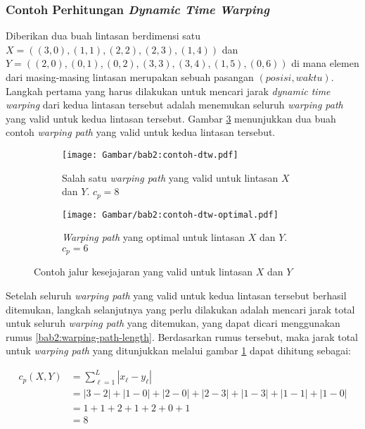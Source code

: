 \documentclass[a4paper,twoside]{article}
\begin{document}
\subsubsection{Contoh Perhitungan \textit{Dynamic Time Warping}}

Diberikan dua buah lintasan berdimensi satu $X = ((3, 0), (1, 1), (2, 2), (2, 3), (1, 4))$ dan $Y = ((2, 0), (0, 1), (0, 2), (3, 3), (3, 4), (1, 5), (0, 6))$ di mana elemen dari masing-masing lintasan merupakan sebuah pasangan $(posisi, waktu)$. Langkah pertama yang harus dilakukan untuk mencari jarak \textit{dynamic time warping} dari kedua lintasan tersebut adalah menemukan seluruh \textit{warping path} yang valid untuk kedua lintasan tersebut. Gambar \ref{bab2:contoh-dtw} menunjukkan dua buah contoh \textit{warping path} yang valid untuk kedua lintasan tersebut.

\begin{figure}[h]
    \centering
    \begin{subfigure}{0.225\textwidth}
        \centering
        \texttt{[image: Gambar/bab2:contoh-dtw.pdf]}
        \caption{Salah satu \textit{warping path} yang valid untuk lintasan $X$ dan $Y$. $c_p = 8$}
        \label{bab2:warping-path}
    \end{subfigure} \hspace{1cm}
    \begin{subfigure}{0.225\textwidth}
        \centering
        \texttt{[image: Gambar/bab2:contoh-dtw-optimal.pdf]}
        \caption{\textit{Warping path} yang optimal untuk lintasan $X$ dan $Y$. $c_p = 6$}
        \label{bab2:warping-path-optimal}
    \end{subfigure}
    \caption{Contoh jalur kesejajaran yang valid untuk lintasan $X$ dan $Y$}
    \label{bab2:contoh-dtw}
\end{figure}

Setelah seluruh \textit{warping path} yang valid untuk kedua lintasan tersebut berhasil ditemukan, langkah selanjutnya yang perlu dilakukan adalah mencari jarak total untuk seluruh \textit{warping path} yang ditemukan, yang dapat dicari menggunakan rumus \ref{bab2:warping-path-length}. Berdasarkan rumus tersebut, maka jarak total untuk \textit{warping path} yang ditunjukkan melalui gambar \ref{bab2:warping-path} dapat dihitung sebagai:

\vspace{-7.5pt}

\begin{align*}
    c_p(X, Y) & = \sum_{\ell = 1}^{L} |x_\ell - y_\ell| \\
    & = |3 - 2| + |1 - 0| + |2 - 0| + |2 - 3| + |1 - 3| + |1 - 1| + |1 - 0| \\
    & = 1 + 1 + 2 + 1 + 2 + 0 + 1 \\
    & = 8
\end{align*}
\end{document}
